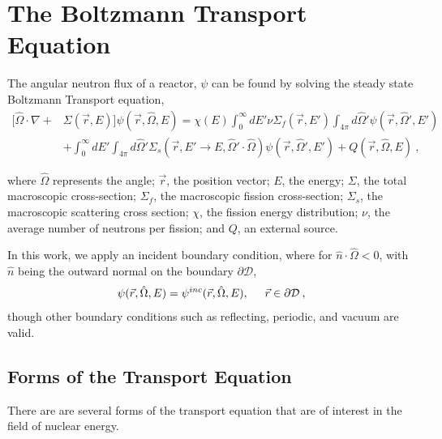 \section{The Boltzmann Transport Equation}
The angular neutron flux of a reactor, $\psi$ can be found by solving the steady state Boltzmann Transport equation,
%
\begin{equation}
\begin{split}
 [\hat{\Omega} \cdot \nabla + &\Sigma(\vec{r}, E)]\psi(\vec{r}, \hat{\Omega}, E) = \chi(E) \int_0^\infty dE' \nu \Sigma_{f}(\vec{r}, E') \int_{4\pi} d\hat{\Omega}'\psi(\vec{r}, \hat{\Omega}', E') \\   &+ \int_0^\infty dE' \int_{4\pi} d\hat{\Omega}' \Sigma_s(\vec{r}, E' \rightarrow E, \hat{\Omega}' \cdot \hat{\Omega})\psi(\vec{r}, \hat{\Omega}', E') + Q(\vec{r}, \hat{\Omega}, E)   \:,
\end{split}
\label{eq:transport}
\end{equation}


where $\hat{\Omega}$ represents the angle; $\vec{r}$, the position vector; $E$, the energy; $\Sigma$, the total macroscopic cross-section; $\Sigma_f$, the macroscopic fission cross-section; $\Sigma_s$, the macroscopic scattering cross section; $\chi$, the fission energy distribution; $\nu$, the average number of neutrons per fission; and $Q$, an external source. 

In this work, we apply an incident boundary condition, where for $\hat{n} \cdot \hat{\Omega} < 0$, with $\hat{n}$ being the outward normal on the boundary $\partial \mathcal{D}$,
\begin{equation}
    \psi(\vec{r}, \hat{\Omega}, E) = \psi^{inc}(\vec{r}, \hat{\Omega}, E), \hspace{5mm} \vec{r} \in \partial \mathcal{D}\:,
\end{equation}
though other boundary conditions such as reflecting, periodic, and vacuum are valid.

\subsection{Forms of the Transport Equation}
There are are several forms of the transport equation that are of interest in the field of nuclear energy. 

